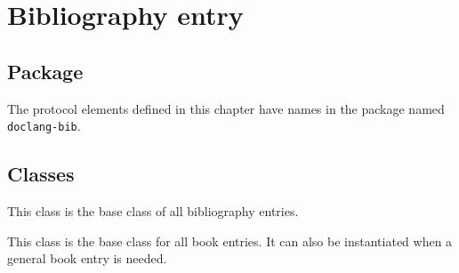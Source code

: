 \chapter{Bibliography entry}
\label{chap-bibliography-entry}

\section{Package}

The protocol elements defined in this chapter have names in the
package named \texttt{doclang-bib}.

\section{Classes}


This class is the base class of all bibliography entries.


This class is the base class for all book entries.  It can also be
instantiated when a general book entry is needed.
